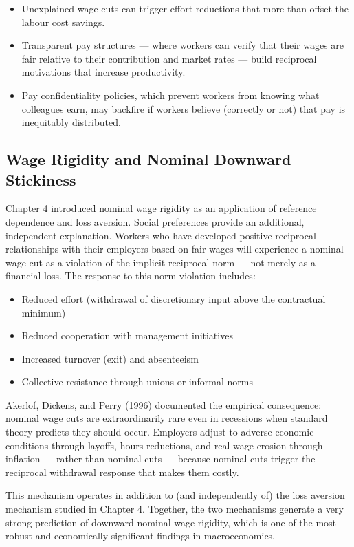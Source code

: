 \documentclass[12pt, letterpaper]{article}
\begin{document}
\begin{itemize}
\item Unexplained wage cuts can trigger effort reductions that more than offset the labour cost savings.
\item Transparent pay structures --- where workers can verify that their wages are fair relative to their contribution and market rates --- build reciprocal motivations that increase productivity.
\item Pay confidentiality policies, which prevent workers from knowing what colleagues earn, may backfire if workers believe (correctly or not) that pay is inequitably distributed.
\end{itemize}


\subsection{Wage Rigidity and Nominal Downward Stickiness}


Chapter 4 introduced nominal wage rigidity as an application of reference dependence and loss aversion. Social preferences provide an additional, independent explanation. Workers who have developed positive reciprocal relationships with their employers based on fair wages will experience a nominal wage cut as a violation of the implicit reciprocal norm --- not merely as a financial loss. The response to this norm violation includes:

\begin{itemize}
\item Reduced effort (withdrawal of discretionary input above the contractual minimum)
\item Reduced cooperation with management initiatives
\item Increased turnover (exit) and absenteeism
\item Collective resistance through unions or informal norms
\end{itemize}

Akerlof, Dickens, and Perry (1996) documented the empirical consequence: nominal wage cuts are extraordinarily rare even in recessions when standard theory predicts they should occur. Employers adjust to adverse economic conditions through layoffs, hours reductions, and real wage erosion through inflation --- rather than nominal cuts --- because nominal cuts trigger the reciprocal withdrawal response that makes them costly.

This mechanism operates in addition to (and independently of) the loss aversion mechanism studied in Chapter 4. Together, the two mechanisms generate a very strong prediction of downward nominal wage rigidity, which is one of the most robust and economically significant findings in macroeconomics.
\end{document}
